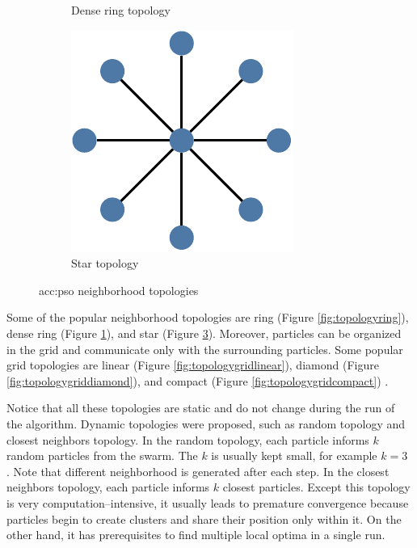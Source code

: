 \begin{figure}[t]
\begin{subfigure}[t]{0.3\textwidth}
        \caption{Dense ring topology}
        \label{fig:topologydensering}
    \end{subfigure}
    \hfill
    \begin{subfigure}[t]{0.3\textwidth}
        \includegraphics[width=\textwidth]{img/master_neigh_star.pdf}
        \caption{Star topology}
        \label{fig:topologystar}
    \end{subfigure}
    \caption{\acrshort*{acc:pso} neighborhood topologies}
\end{figure}

Some of the popular neighborhood topologies are ring (Figure \ref{fig:topologyring}), dense ring (Figure \ref{fig:topologydensering}), and star (Figure \ref{fig:topologystar}). Moreover, particles can be organized in the grid and communicate only with the surrounding particles. Some popular grid topologies are linear (Figure \ref{fig:topologygridlinear}), diamond (Figure \ref{fig:topologygriddiamond}), and compact (Figure \ref{fig:topologygridcompact}) \citep{PSOtopologies}.

Notice that all these topologies are static and do not change during the run of the algorithm. Dynamic topologies were proposed, such as random topology and closest neighbors topology. In the random topology, each particle informs $k$ random particles from the swarm. The $k$ is usually kept small, for example $k=3$ \citep{SPSObenchmark}. Note that different neighborhood is generated after each step. In the closest neighbors topology, each particle informs $k$ closest particles. Except this topology is very computation--intensive, it usually leads to premature convergence because particles begin to create clusters and share their position only within it. On the other hand, it has prerequisites to find multiple local optima in a single run.

